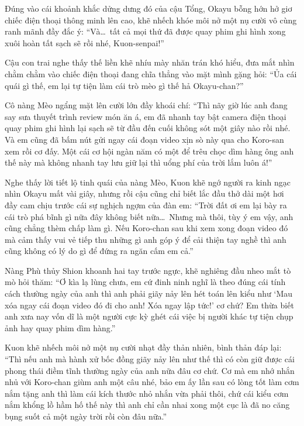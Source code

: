 \documentclass[../main.tex]{subfiles}
\begin{document}
Đúng vào cái khoảnh khắc dửng dưng đó của cậu Tổng, Okayu bỗng hớn hở giơ chiếc điện thoại thông minh lên cao, khẽ nhếch khóe môi nở một nụ cười vô cùng ranh mãnh đầy đắc ý: ``Và\dots\ tất cả mọi thứ đã được quay phim ghi hình xong xuôi hoàn tất sạch sẽ rồi nhé, Kuon-senpai!''

Cậu con trai nghe thấy thế liền khẽ nhíu mày nhăn trán khó hiểu, đưa mắt nhìn chằm chằm vào chiếc điện thoại đang chĩa thẳng vào mặt mình gặng hỏi: ``Ủa cái quái gì thế, em lại tự tiện làm cái trò mèo gì thế hả Okayu-chan?''

Cô nàng Mèo ngẩng mặt lên cười lớn đầy khoái chí: ``Thì nãy giờ lúc anh đang say sưa thuyết trình review món ăn á, em đã nhanh tay bật camera điện thoại quay phim ghi hình lại sạch sẽ từ đầu đến cuối không sót một giây nào rồi nhé. Và em cũng đã bấm nút gửi ngay cái đoạn video xịn sò này qua cho Koro-san xem rồi cơ đấy. Một cái cơ hội ngàn năm có một để trêu chọc dìm hàng ông anh thế này mà không nhanh tay lưu giữ lại thì uổng phí của trời lắm luôn á!''

Nghe thấy lời tiết lộ tinh quái của nàng Mèo, Kuon khẽ ngớ người ra kinh ngạc nhìn Okayu mất vài giây, nhưng rồi cậu cũng chỉ biết lắc đầu thở dài một hơi đầy cam chịu trước cái sự nghịch ngợm của đàn em: ``Trời đất ơi em lại bày ra cái trò phá bĩnh gì nữa đây không biết nữa\dots\ Nhưng mà thôi, tùy ý em vậy, anh cũng chẳng thèm chấp làm gì. Nếu Koro-chan sau khi xem xong đoạn video đó mà cảm thấy vui vẻ tiếp thu những gì anh góp ý để cải thiện tay nghề thì anh cũng không có lý do gì để đứng ra ngăn cấm em cả.''

Nàng Phù thủy Shion khoanh hai tay trước ngực, khẽ nghiêng đầu nheo mắt tò mò hỏi thăm: ``Ơ kìa lạ lùng chưa, em cứ đinh ninh nghĩ là theo đúng cái tính cách thường ngày của anh thì anh phải giãy nảy lên hét toán lên kiểu như `Mau xóa ngay cái đoạn video đó đi cho anh! Xóa ngay lập tức!' cơ chứ? Em thừa biết anh xưa nay vốn dĩ là một người cực kỳ ghét cái việc bị người khác tự tiện chụp ảnh hay quay phim dìm hàng.''

Kuon khẽ nhếch môi nở một nụ cười nhạt đầy thản nhiên, bình thản đáp lại: ``Thì nếu anh mà hành xử bốc đồng giãy nảy lên như thế thì có còn giữ được cái phong thái điềm tĩnh thường ngày của anh nữa đâu cơ chứ. Cơ mà em nhớ nhắn nhủ với Koro-chan giùm anh một câu nhé, bảo em ấy lần sau có lòng tốt làm cơm nắm tặng anh thì làm cái kích thước nhỏ nhắn vừa phải thôi, chứ cái kiểu cơm nắm khổng lồ hầm hố thế này thì anh chỉ cần nhai xong một cục là đã no căng bụng suốt cả một ngày trời rồi còn đâu nữa.''
\end{document}
